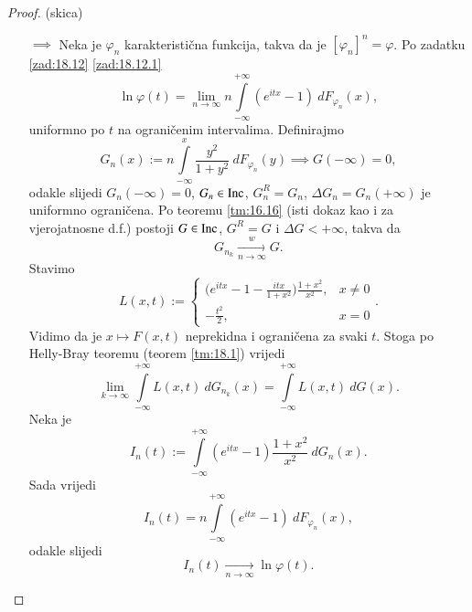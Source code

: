 \begin{proof}{(skica)}
    \begin{enumerate}
        \item[$\implies$]
        Neka je $\varphi_n$ karakteristi\v cna funkcija, takva da je $[\varphi_n]^n = \varphi$.
        Po zadatku \ref{zad:18.12} \ref{zad:18.12.1}
        \begin{equation*}
            \ln \varphi (t) = \lim\limits_{n \to \infty} n \int\limits_{-\infty}^{+\infty} (e^{itx} - 1) \: d F_{\varphi_n} (x),
        \end{equation*}
        uniformno po $t$ na ograni\v cenim intervalima.
        Definirajmo
        \begin{equation*}
            G_n (x) := n \int\limits_{-\infty}^x \frac{y^2}{1 + y^2} \: d F_{\varphi_n} (y) \implies G(-\infty) = 0,
        \end{equation*}
        odakle slijedi $G_n(-\infty) = 0$, $G_n \in \mathrm{Inc}$, $G_n^R = G_n$, $\Delta G_n = G_n (+\infty)$ je uniformno ograni\v cena.
        Po teoremu \ref{tm:16.16} (isti dokaz kao i za vjerojatnosne d.f.) postoji $G \in \mathrm{Inc}$, $G^R = G$ i $\Delta G < +\infty$, takva da
        \begin{equation*}
            G_{n_k} \xrightarrow[n \to \infty]{w} G.
        \end{equation*}
        Stavimo
        \begin{equation*}
            L(x, t) :=
            \begin{cases}
                \big( e^{itx} - 1 - \frac{itx}{1 + x^2} \big) \frac{1 + x^2}{x^2}, &x \neq 0\\
                -\frac{t^2}{2}, &x = 0
            \end{cases}.
        \end{equation*}
        Vidimo da je $x \mapsto F(x, t)$ neprekidna i ograni\v cena za svaki $t$.
        Stoga po Helly-Bray teoremu (teorem \ref{tm:18.1}) vrijedi
        \begin{equation*}
            \lim\limits_{k \to \infty} \int\limits_{-\infty}^{+\infty} L(x, t) \: d G_{n_k} (x) = \int\limits_{-\infty}^{+\infty} L(x, t) \: d G(x).
        \end{equation*}
        Neka je
        \begin{equation*}
            I_n(t) := \int\limits_{-\infty}^{+\infty} (e^{itx} - 1) \frac{1 + x^2}{x^2} \: d G_n (x).
        \end{equation*}
        Sada vrijedi
        \begin{equation*}
            I_n (t) = n \int\limits_{-\infty}^{+\infty} (e^{itx} - 1) \: d F_{\varphi_n} (x),
        \end{equation*}
        odakle slijedi
        \begin{equation*}
            I_n (t) \xrightarrow[n \to \infty]{} \ln \varphi (t).
        \end{equation*}


\end{enumerate}
\end{proof}
